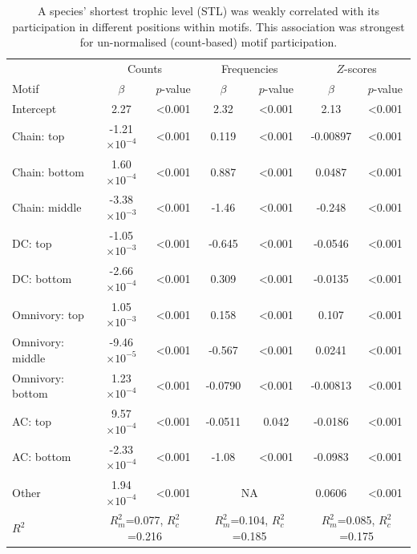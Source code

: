 \documentclass[12pt]{article}
\begin{document}
\begin{spacing}{2.0}
			\begin{table}[hb!]
    			\caption{A species' shortest trophic level (STL) was weakly correlated with its participation in different positions within motifs. This association was strongest for un-normalised (count-based) motif participation.}
    			\label{tab:positions_vs_STL}
    			\begin{tabular}{l | c c | c c | c c}
    			& \multicolumn{2}{c|}{Counts} & \multicolumn{2}{c|}{Frequencies} & \multicolumn{2}{c}{$Z$-scores} \\
    			Motif & $\beta$ & $p$-value & $\beta$ & $p$-value & $\beta$ & $p$-value \\
    			\hline
                Intercept	&	2.27	&	\textless0.001	&	2.32	&	\textless0.001	&	2.13	&	\textless0.001	\\
                Chain: top	&	-1.21$\times10^{-4}$	&	\textless0.001	&	0.119	&	\textless0.001	&	-0.00897	&	\textless0.001	\\
                Chain: bottom	&	1.60$\times10^{-4}$	&	\textless0.001	&	0.887	&	\textless0.001	&	0.0487	&	\textless0.001	\\
                Chain: middle	&	-3.38$\times10^{-3}$	&	\textless0.001	&	-1.46	&	\textless0.001	&	-0.248	&	\textless0.001	\\
                DC: top	&	-1.05$\times10^{-3}$	&	\textless0.001	&	-0.645	&	\textless0.001	&	-0.0546	&	\textless0.001	\\
                DC: bottom	&	-2.66$\times10^{-4}$	&	\textless0.001	&	0.309	&	\textless0.001	&	-0.0135	&	\textless0.001	\\
                Omnivory: top	&	1.05$\times10^{-3}$	&	\textless0.001	&	0.158	&	\textless0.001	&	0.107	&	\textless0.001	\\
                Omnivory: middle	&	-9.46$\times10^{-5}$ &	\textless0.001	&	-0.567	&	\textless0.001	&	0.0241	&	\textless0.001	\\
                Omnivory: bottom	&	1.23$\times10^{-4}$	&	\textless0.001	&	-0.0790	&	\textless0.001	&	-0.00813	&	\textless0.001	\\
                AC: top	&	9.57$\times10^{-4}$	&	\textless0.001	&	-0.0511	&	0.042	&	-0.0186	&	\textless0.001	\\
                AC: bottom	&	-2.33$\times10^{-4}$	&	\textless0.001	&	-1.08	&	\textless0.001	&	-0.0983	&	\textless0.001	\\
                Other	&	1.94$\times10^{-4}$	&	\textless0.001	&	\multicolumn{2}{c|}{NA}			&	0.0606	&	\textless0.001	\\
    			\hline
    			$R^2$ & \multicolumn{2}{c|}{\tiny{$R^2_m$=0.077, $R^2_c$=0.216}} & 
    			\multicolumn{2}{c|}{\tiny{$R^2_m$=0.104, $R^2_c$=0.185}} & 
    			\multicolumn{2}{c}{\tiny{$R^2_m$=0.085, $R^2_c$=0.175}} \\
    			\end{tabular}
    			\end{table}


\end{spacing}
\end{document}
